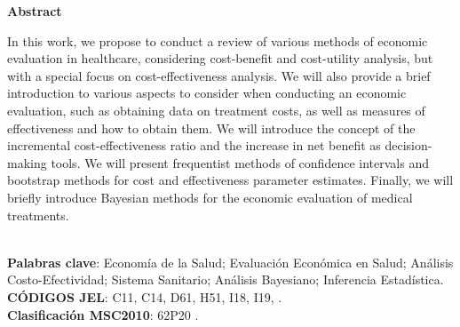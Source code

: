 \documentclass[12pt]{article}
\begin{document}
\begin{center}
\textbf{Abstract}

\end{center}
In this work, we propose to conduct a review of various methods of economic evaluation in healthcare, considering cost-benefit and cost-utility analysis, but with a special focus on cost-effectiveness analysis. We will also provide a brief introduction to various aspects to consider when conducting an economic evaluation, such as obtaining data on treatment costs, as well as measures of effectiveness and how to obtain them. We will introduce the concept of the incremental cost-effectiveness ratio and the increase in net benefit as decision-making tools. We will present frequentist methods of confidence intervals and bootstrap methods for cost and effectiveness parameter estimates. Finally, we will briefly introduce Bayesian methods for the economic evaluation of medical treatments.


\vspace{0.5cm}\\
\textbf{Palabras clave}: Economía de la Salud; Evaluación Económica en Salud; Análisis Costo-Efectividad; Sistema Sanitario; Análisis Bayesiano; Inferencia Estadística.
\vspace{0.5cm}\\ %
\textbf{C\'ODIGOS JEL}: C11, C14, D61, H51, I18, I19, .
\vspace{0.5cm}\\
\textbf{Clasificaci\'on MSC2010}: 62P20 .




%
%
\pagebreak


\pagestyle{fancy}
\fancyhf{}
\fancyhead[RE,LO]{}
\fancyhead[LE,RO]{\thepage}

\tableofcontents
		
\end{document}
